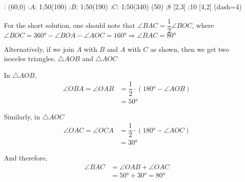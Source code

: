 \ifprintanswers
\fi 
\begin{marginfigure}
    : (60,0)
    :$A$: 1;50(100)
    :$B$: 1;50(190)
    :$C$: 1;50(340)
	\figdrawbegin{}
	(50)
    \figdrawline [1,2]
    \figdrawline [1,3]
    \figdrawline [1,4]
    ;8 [2,3]
    ;10 [4,2]
    \ifprintanswers
      \figset (dash=4)
      \figdrawline [3,2,4]
    \fi
	\figdrawend
  \centerline{\box\figBoxA}
\end{marginfigure}
\begin{solution}[\halfpage]
  For the short solution, one should note that $\angle BAC = \dfrac{1}{2}\angle BOC$,
  where $\angle BOC = \ang{360} - \angle BOA - \angle AOC = \ang{160} \Rightarrow \angle BAC = \ang{80}$

	Alternatively, if we join $A$ with $B$ and $A$ with $C$ as shown, then we get two isoceles 
	triangles, $\triangle AOB$ and $\triangle AOC$
	
	In $\triangle AOB$,
	\begin{align}
		\angle OBA = \angle OAB &= \dfrac{1}{2}\cdot(\ang{180}-\angle AOB) \\
		                        &= \ang{50}
	\end{align}
	
	Similarly, in $\triangle AOC$
	\begin{align}
		\angle OAC = \angle OCA &= \dfrac{1}{2}\cdot(\ang{180}-\angle AOC) \\
		                        &= \ang{30}
	\end{align}
	
	And therefore,
	\begin{align}
		\angle BAC &= \angle OAB + \angle OAC \\
		           &= \ang{50} + \ang{30} = \ang{80}
	\end{align}

\end{solution}
